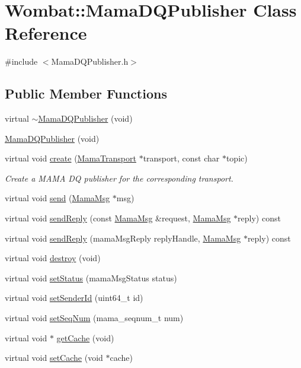 \hypertarget{classWombat_1_1MamaDQPublisher}{
\section{Wombat::MamaDQPublisher Class Reference}
\label{classWombat_1_1MamaDQPublisher}
}


{\ttfamily \#include $<$MamaDQPublisher.h$>$}\subsection*{Public Member Functions}
\begin{DoxyCompactItemize}
\item 
virtual \hyperlink{classWombat_1_1MamaDQPublisher_ab62890fa9c9778e0a73dbb11a7d73af2}{$\sim$MamaDQPublisher} (void)
\item 
\hyperlink{classWombat_1_1MamaDQPublisher_a18044a1c4e48e1297f5e567a28fe2381}{MamaDQPublisher} (void)
\item 
virtual void \hyperlink{classWombat_1_1MamaDQPublisher_a400bad2aad6fde5e1c471160655980b8}{create} (\hyperlink{classWombat_1_1MamaTransport}{MamaTransport} $\ast$transport, const char $\ast$topic)
\begin{DoxyCompactList}\small\item\em Create a MAMA DQ publisher for the corresponding transport. \item\end{DoxyCompactList}\item 
virtual void \hyperlink{classWombat_1_1MamaDQPublisher_a5c6530a260495e16e494121134990cba}{send} (\hyperlink{classWombat_1_1MamaMsg}{MamaMsg} $\ast$msg)
\item 
virtual void \hyperlink{classWombat_1_1MamaDQPublisher_a3a7c72fc23212292260c7955362acbb1}{sendReply} (const \hyperlink{classWombat_1_1MamaMsg}{MamaMsg} \&request, \hyperlink{classWombat_1_1MamaMsg}{MamaMsg} $\ast$reply) const 
\item 
virtual void \hyperlink{classWombat_1_1MamaDQPublisher_ab91d581e94f91555d48070e861b12c8e}{sendReply} (mamaMsgReply replyHandle, \hyperlink{classWombat_1_1MamaMsg}{MamaMsg} $\ast$reply) const 
\item 
virtual void \hyperlink{classWombat_1_1MamaDQPublisher_ab67727cbb5bfc1320ac113bcee66b6f0}{destroy} (void)
\item 
virtual void \hyperlink{classWombat_1_1MamaDQPublisher_ad6e224a971b37aa1bf9c96136ade2278}{setStatus} (mamaMsgStatus status)
\item 
virtual void \hyperlink{classWombat_1_1MamaDQPublisher_a29822832694ee1dc2211c91712082eed}{setSenderId} (uint64\_\-t id)
\item 
virtual void \hyperlink{classWombat_1_1MamaDQPublisher_af4e8c027f5c0655920be2aa7bccad41e}{setSeqNum} (mama\_\-seqnum\_\-t num)
\item 
virtual void $\ast$ \hyperlink{classWombat_1_1MamaDQPublisher_a16f6fc4ed53e0d267d98f9d40231f8ab}{getCache} (void)
\item 
virtual void \hyperlink{classWombat_1_1MamaDQPublisher_aa88420a3d4777258667a413b253bacff}{setCache} (void $\ast$cache)
\end{DoxyCompactItemize}
